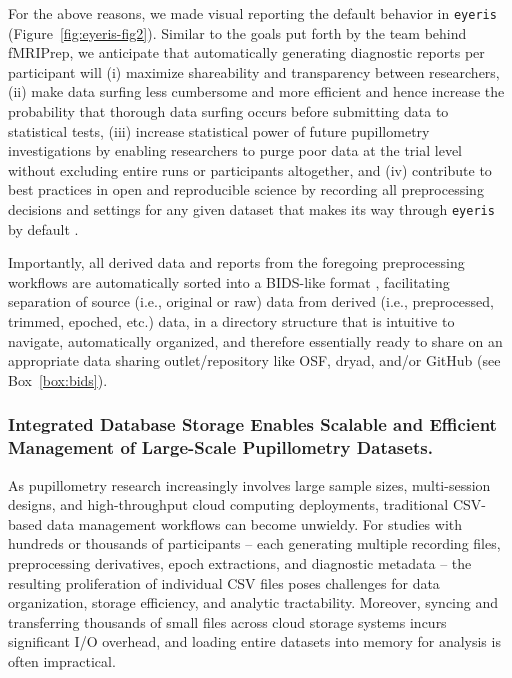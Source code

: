 For the above reasons, we made visual reporting the default behavior in \texttt{eyeris} (Figure~\ref{fig:eyeris-fig2}). Similar to the goals put forth by the team behind fMRIPrep, we anticipate that automatically generating diagnostic reports per participant will (i) maximize shareability and transparency between researchers, (ii) make data surfing less cumbersome and more efficient and hence increase the probability that thorough data surfing occurs before submitting data to statistical tests, (iii) increase statistical power of future pupillometry investigations by enabling researchers to purge poor data at the trial level without excluding entire runs or participants altogether, and (iv) contribute to best practices in open and reproducible science by recording all preprocessing decisions and settings for any given dataset that makes its way through \texttt{eyeris} by default \parencite{esteban2020analysis,esteban2019fmriprep,poldrack2019computational}.

Importantly, all derived data and reports from the foregoing preprocessing workflows are automatically sorted into a BIDS-like format \parencite{gorgolewski2016brain}, facilitating separation of source (i.e., original or raw) data from derived (i.e., preprocessed, trimmed, epoched, etc.) data, in a directory structure that is intuitive to navigate, automatically organized, and therefore essentially ready to share on an appropriate data sharing outlet/repository like OSF, dryad, and/or GitHub (see Box~\ref{box:bids}).

\subsubsection{Integrated Database Storage Enables Scalable and Efficient Management of Large-Scale Pupillometry Datasets.}
As pupillometry research increasingly involves large sample sizes, multi-session designs, and high-throughput cloud computing deployments, traditional CSV-based data management workflows can become unwieldy. For studies with hundreds or thousands of participants – each generating multiple recording files, preprocessing derivatives, epoch extractions, and diagnostic metadata – the resulting proliferation of individual CSV files poses challenges for data organization, storage efficiency, and analytic tractability. Moreover, syncing and transferring thousands of small files across cloud storage systems incurs significant I/O overhead, and loading entire datasets into memory for analysis is often impractical.

